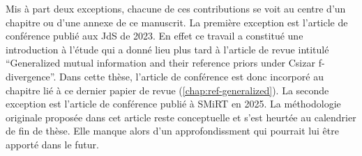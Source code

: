 Mis à part deux exceptions, chacune de ces contributions se voit au centre d'un chapitre ou d'une annexe de ce manuscrit.
La première exception est l'article de conférence publié aux JdS de 2023. En effet ce travail a constitué une introduction à l'étude qui a donné lieu plus tard à l'article de revue intitulé ``Generalized mutual information and their reference priors under Csizar f-divergence''. Dans cette thèse, l'article de conférence est donc incorporé au chapitre lié à ce dernier papier de revue (\cref{chap:ref-generalized}).
La seconde exception est l'article de conférence publié à SMiRT en 2025. La méthodologie originale proposée dans cet article reste conceptuelle et s'est heurtée au calendrier de fin de thèse. %
Elle manque alors d'un approfondissment qui pourrait lui être apporté dans le futur.


%
%
% 
%





































\newpage
\thispagestyle{plain}
\renewcommand{\chaptertitlenamelng}{Chapter}
\renewcommand{\partname}{Part}
